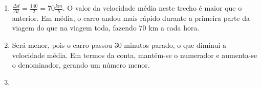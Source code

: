 \documentclass[10 pt,usenames,dvipsnames, oneside]{article}
\begin{document}
\begin{solucao}
\begin{enumerate}
\item $\displaystyle\frac{\Delta d}{\Delta t}= \frac{140}{2}=70\frac{km}{h}$. O valor da velocidade média neste trecho é maior que o anterior. Em média, o carro andou mais rápido durante a primeira parte da viagem do que na viagem toda, fazendo $70$ km a cada hora.

\item Será menor, pois o carro passou 30 minutos parado, o que diminui a velocidade média. Em termos da conta, mantém-se o numerador e aumenta-se o denominador, gerando um número menor.

\clearpage
\item {}

\end{enumerate}

\end{solucao}
\fi
\end{document}
